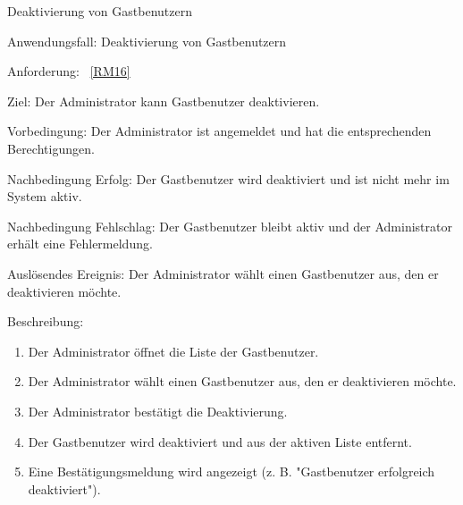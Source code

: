 \begin{function}{40}{Deaktivierung von Gastbenutzern}
    \item[Anwendungsfall:] Deaktivierung von Gastbenutzern
    \item[Anforderung:] ~\ref{RM16}
    \item[Ziel:] Der Administrator kann Gastbenutzer deaktivieren.
    \item[Vorbedingung:] Der Administrator ist angemeldet und hat die entsprechenden Berechtigungen.
    \item[Nachbedingung Erfolg:] Der Gastbenutzer wird deaktiviert und ist nicht mehr im System aktiv.
    \item[Nachbedingung Fehlschlag:] Der Gastbenutzer bleibt aktiv und der Administrator erhält eine Fehlermeldung.
    \item[Auslösendes Ereignis:] Der Administrator wählt einen Gastbenutzer aus, den er deaktivieren möchte.
    \item[Beschreibung:] ~
    \begin{enumerate}
        \item Der Administrator öffnet die Liste der Gastbenutzer.
        \item Der Administrator wählt einen Gastbenutzer aus, den er deaktivieren möchte.
        \item Der Administrator bestätigt die Deaktivierung.
        \item Der Gastbenutzer wird deaktiviert und aus der aktiven Liste entfernt.
        \item Eine Bestätigungsmeldung wird angezeigt (z. B. "Gastbenutzer erfolgreich deaktiviert").
    \end{enumerate}
\end{function}

